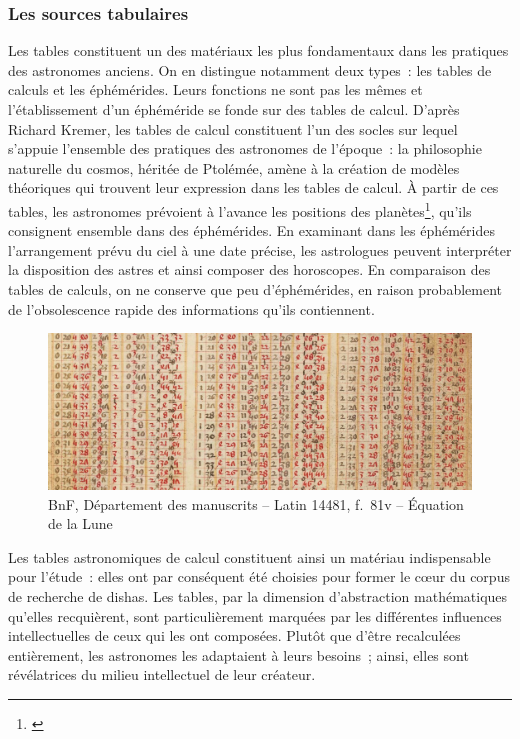 \documentclass[a4paper,12pt,twoside]{book}
\newcommand{\dishas}{\gls{dishas}\xspace}
\begin{document}
			\subsubsection{Les sources tabulaires}
Les tables constituent un des matériaux les plus fondamentaux dans les pratiques des astronomes anciens. On en distingue notamment deux types~: les tables de calculs et les éphémérides. Leurs fonctions ne sont pas les mêmes et l'établissement d'un éphéméride se fonde sur des tables de calcul. D'après Richard Kremer, les tables de calcul constituent l'un des socles sur lequel s'appuie l'ensemble des pratiques des astronomes de l'époque~: la philosophie naturelle du cosmos, héritée de Ptolémée, amène à la création de modèles théoriques qui trouvent leur expression dans les tables de calcul. À partir de ces tables, les astronomes prévoient à l'avance les positions des planètes\footnote{\cite{poullePositionsPlanetesAu1967a}}, qu'ils consignent ensemble dans des éphémérides. En examinant dans les éphémérides l'arrangement prévu du ciel à une date précise, les astrologues peuvent interpréter la disposition des astres et ainsi composer des horoscopes. En comparaison des tables de calculs, on ne conserve que peu d'éphémérides, en raison probablement de l'obsolescence rapide des informations qu'ils contiennent.

\begin{figure}[h!]
	\centering
	\includegraphics[width=12cm]{Images/Latin_14481.png}
	\caption{BnF, Département des manuscrits – Latin 14481, f.~81v – Équation de la Lune}
\end{figure}

Les tables astronomiques de calcul constituent ainsi un matériau indispensable pour l'étude~: elles ont par conséquent été choisies pour former le cœur du corpus de recherche de \dishas. Les tables, par la dimension d'abstraction mathématiques qu'elles recquièrent, sont particulièrement marquées par les différentes influences intellectuelles de ceux qui les ont composées. Plutôt que d'être recalculées entièrement, les astronomes les adaptaient à leurs besoins~; ainsi, elles sont révélatrices du milieu intellectuel de leur créateur.
\end{document}
